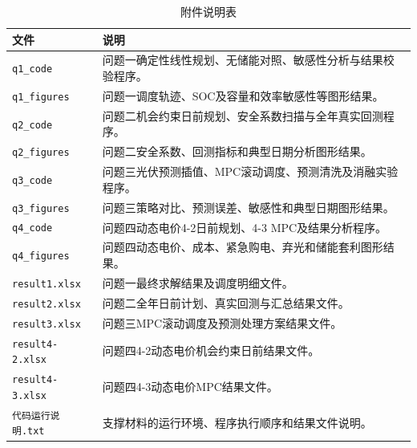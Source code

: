 \documentclass{cumcmthesis}
\begin{document}
\begin{table}[H]
\centering
\normalsize
\renewcommand\arraystretch{1.45}
\setlength{\tabcolsep}{10pt}
\caption{附件说明表}
\label{tab:appendix_support}
\begin{tabularx}{\textwidth}{p{5.0cm}X}
\toprule
\textbf{文件} & \textbf{说明}\\
\midrule
\texttt{q1\_code} & 问题一确定性线性规划、无储能对照、敏感性分析与结果校验程序。\\
\texttt{q1\_figures} & 问题一调度轨迹、SOC及容量和效率敏感性等图形结果。\\
\texttt{q2\_code} & 问题二机会约束日前规划、安全系数扫描与全年真实回测程序。\\
\texttt{q2\_figures} & 问题二安全系数、回测指标和典型日期分析图形结果。\\
\texttt{q3\_code} & 问题三光伏预测插值、MPC滚动调度、预测清洗及消融实验程序。\\
\texttt{q3\_figures} & 问题三策略对比、预测误差、敏感性和典型日期图形结果。\\
\texttt{q4\_code} & 问题四动态电价4-2日前规划、4-3 MPC及结果分析程序。\\
\texttt{q4\_figures} & 问题四动态电价、成本、紧急购电、弃光和储能套利图形结果。\\
\texttt{result1.xlsx} & 问题一最终求解结果及调度明细文件。\\
\texttt{result2.xlsx} & 问题二全年日前计划、真实回测与汇总结果文件。\\
\texttt{result3.xlsx} & 问题三MPC滚动调度及预测处理方案结果文件。\\
\texttt{result4-2.xlsx} & 问题四4-2动态电价机会约束日前结果文件。\\
\texttt{result4-3.xlsx} & 问题四4-3动态电价MPC结果文件。\\
\texttt{代码运行说明.txt} & 支撑材料的运行环境、程序执行顺序和结果文件说明。\\
\bottomrule
\end{tabularx}
\end{table}
\end{document}
